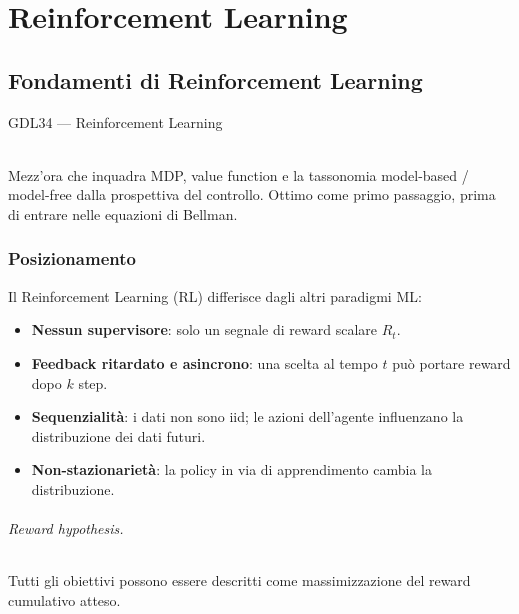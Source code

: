 \part{Reinforcement Learning}
\label{part:rl}

\chapter{Fondamenti di Reinforcement Learning}

\begin{risorsevideo}{GDL34 — Reinforcement Learning}

\medskip
{}\\
Mezz'ora che inquadra MDP, value function e la tassonomia model-based / model-free dalla prospettiva del controllo. Ottimo come primo passaggio, prima di entrare nelle equazioni di Bellman.
\end{risorsevideo}
\label{ch:rl-fund}

\section{Posizionamento}

Il Reinforcement Learning (RL) differisce dagli altri paradigmi ML:
\begin{itemize}
  \item \textbf{Nessun supervisore}: solo un segnale di reward scalare $R_t$.
  \item \textbf{Feedback ritardato e asincrono}: una scelta al tempo $t$ può portare reward dopo $k$ step.
  \item \textbf{Sequenzialità}: i dati non sono iid; le azioni dell'agente influenzano la distribuzione dei dati futuri.
  \item \textbf{Non-stazionarietà}: la policy in via di apprendimento cambia la distribuzione.
\end{itemize}

\paragraph{Reward hypothesis.} Tutti gli obiettivi possono essere descritti come massimizzazione del reward cumulativo atteso.

